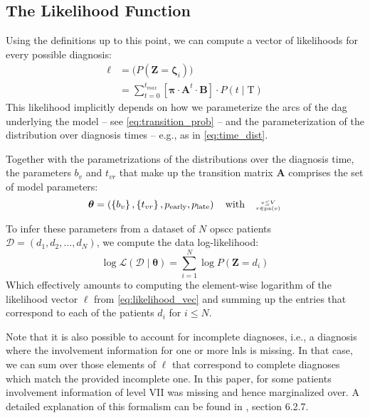 \documentclass[twocolumn]{article}
\begin{document}
\subsection{The Likelihood Function}
\label{subsec:formalism:likelihood}

Using the definitions up to this point, we can compute a vector of likelihoods for every possible diagnosis:
%
\begin{equation} \label{eq:likelihood_vec}
\begin{split}
    \boldsymbol{\ell} &= \big( P\left( \mathbf{Z} = \boldsymbol{\zeta}_i \right) \big) \\
    &= \sum_{t=0}^{t_{max}} \left[ \boldsymbol{\pi} \cdot \mathbf{A}^t \cdot \mathbf{B} \right] \cdot P \left( t \mid \text{T} \right)
\end{split}
\end{equation}
%
This likelihood implicitly depends on how we parameterize the arcs of the \gls{dag} underlying the model -- see \cref{eq:transition_prob} -- and the parameterization of the distribution over diagnosis times -- e.g., as in \cref{eq:time_dist}. 

Together with the parametrizations of the distributions over the diagnosis time, the parameters $b_v$ and $t_{vr}$ that make up the transition matrix $\mathbf{A}$ comprises the set of model parameters:
%
\begin{equation}
    \boldsymbol{\theta} = \left( \left\{ b_v \right\}, \left\{ t_{vr} \right\}, p_\text{early}, p_\text{late} \right) \quad \text{with} \quad \genfrac{}{}{0pt}{2}{v\leq V}{r\in\operatorname{pa}(v)}
\end{equation}

To infer these parameters from a dataset of $N$ \gls{opscc} patients $\boldsymbol{\mathcal{D}} = \left( d_1, d_2, \ldots, d_N \right)$, we compute the data log-likelihood:
%
\begin{equation} \label{eq:log_likelihood}
    \log\mathcal{L} \left( \boldsymbol{\mathcal{D}} \mid \boldsymbol{\theta} \right) = \sum_{i=1}^N \log P \left( \mathbf{Z} = d_i \right)
\end{equation}
%
Which effectively amounts to computing the element-wise logarithm of the likelihood vector $\boldsymbol{\ell}$ from \cref{eq:likelihood_vec} and summing up the entries that correspond to each of the patients $d_i$ for $i\leq N$.

Note that it is also possible to account for incomplete diagnoses, i.e., a diagnosis where the involvement information for one or more \glspl{lnl} is missing. In that case, we can sum over those elements of $\boldsymbol{\ell}$ that correspond to complete diagnoses which match the provided incomplete one. In this paper, for some patients involvement information of level VII was missing and hence marginalized over. A detailed explanation of this formalism can be found in \cite{zora231470}, section 6.2.7.
\end{document}
